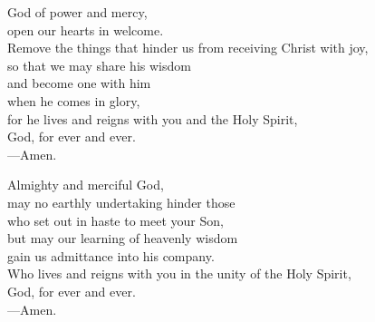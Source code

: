 \prayer


\begin{prayerverse}
God of power and mercy,\\
open our hearts in welcome.\\
Remove the things that hinder us from receiving Christ with joy,\\
so that we may share his wisdom\\
and become one with him\\
when he comes in glory,\\
for he lives and reigns with you and the Holy Spirit,\\
God, for ever and ever.\\
{\color{red}---\thinspace}Amen.
\end{prayerverse}


\begin{prayerverse}
Almighty and merciful God,\\
may no earthly undertaking hinder those\\
who set out in haste to meet your Son,\\
 but may our learning of heavenly wisdom\\
gain us admittance into his company.\\
Who lives and reigns with you in the unity of the Holy Spirit,\\
God, for ever and ever.\\
{\color{red}---\thinspace}Amen.
\end{prayerverse}

